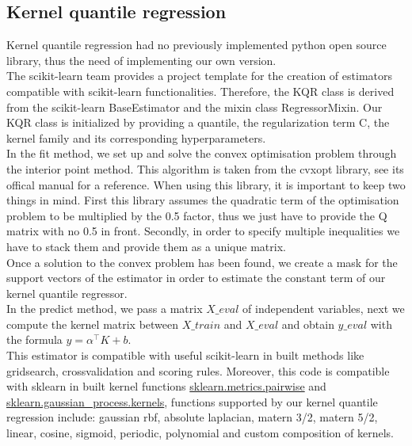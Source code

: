 \subsection{Kernel quantile regression}
Kernel quantile regression had no previously implemented python open source library, thus the need of implementing our own version.
\\
The scikit-learn team provides a project template for the creation of estimators compatible with scikit-learn functionalities. Therefore, the KQR class is derived from the scikit-learn BaseEstimator and the mixin class RegressorMixin.
Our KQR class is initialized by providing a quantile, the regularization term C, the kernel family and its corresponding hyperparameters.
\\
In the fit method, we set up and solve the convex optimisation problem through the interior point method. This algorithm is taken from the cvxopt library, see its offical manual \cite{vandenberghe2010cvxopt} for a reference.
When using this library, it is important to keep two things in mind. First this library assumes the quadratic term of the optimisation problem to be multiplied by the 0.5 factor, thus we just have to provide the Q matrix with no 0.5 in front.
Secondly, in order to specify multiple inequalities we have to stack them and provide them as a unique matrix.
\\
Once a solution to the convex problem has been found, we create a mask for the support vectors of the estimator in order to estimate the constant term of our kernel quantile regressor.
\\
In the predict method, we pass a matrix $X\_eval$ of independent variables, next we compute the kernel matrix between $X\_train$ and $X\_eval$ and obtain $y\_eval$ with the formula $y=\alpha^\intercal K+b$.
\\
This estimator is compatible with useful scikit-learn in built methods like gridsearch, crossvalidation and scoring rules. Moreover, this code is compatible with sklearn in built kernel functions \href{https://scikit-learn.org/stable/modules/classes.html#module-sklearn.metrics.pairwise}{sklearn.metrics.pairwise} and \href{https://scikit-learn.org/stable/modules/classes.html#module-sklearn.gaussian_process.kernels}{sklearn.gaussian\_process.kernels}, functions supported by our kernel quantile regression include: gaussian rbf, absolute laplacian, matern 3/2, matern 5/2, linear, cosine, sigmoid, periodic, polynomial and custom composition of kernels.



